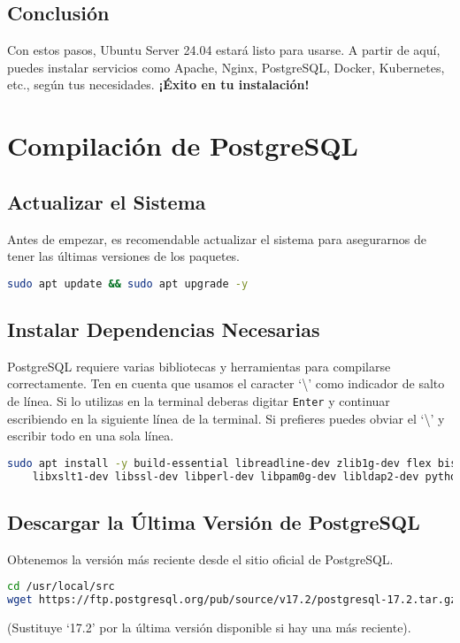 \documentclass{article}
\begin{document}
\subsection{Conclusión}
Con estos pasos, Ubuntu Server 24.04 estará listo para usarse. A partir de aquí, puedes instalar servicios como Apache, Nginx, PostgreSQL, Docker, Kubernetes, etc., según tus necesidades. \textbf{¡Éxito en tu instalación!}

\section{Compilación de PostgreSQL}

\subsection{Actualizar el Sistema}
Antes de empezar, es recomendable actualizar el sistema para asegurarnos de tener las últimas versiones de los paquetes.

\begin{lstlisting}[language=bash]
sudo apt update && sudo apt upgrade -y
\end{lstlisting}

\subsection{Instalar Dependencias Necesarias}
PostgreSQL requiere varias bibliotecas y herramientas para compilarse correctamente.  Ten en cuenta que usamos el caracter `\textbackslash' como indicador de salto de línea.  Si lo utilizas en la terminal deberas digitar \texttt{Enter} y continuar escribiendo en la siguiente línea de la terminal.  Si prefieres puedes obviar el `\textbackslash' y escribir todo en una sola línea.

\begin{lstlisting}[language=bash]
sudo apt install -y build-essential libreadline-dev zlib1g-dev flex bison libxml2-dev \
    libxslt1-dev libssl-dev libperl-dev libpam0g-dev libldap2-dev python3-dev uuid-dev
\end{lstlisting}

\subsection{Descargar la Última Versión de PostgreSQL}
Obtenemos la versión más reciente desde el sitio oficial de PostgreSQL.

\begin{lstlisting}[language=bash]
cd /usr/local/src
wget https://ftp.postgresql.org/pub/source/v17.2/postgresql-17.2.tar.gz
\end{lstlisting}
(Sustituye `17.2' por la última versión disponible si hay una más reciente).
\end{document}

